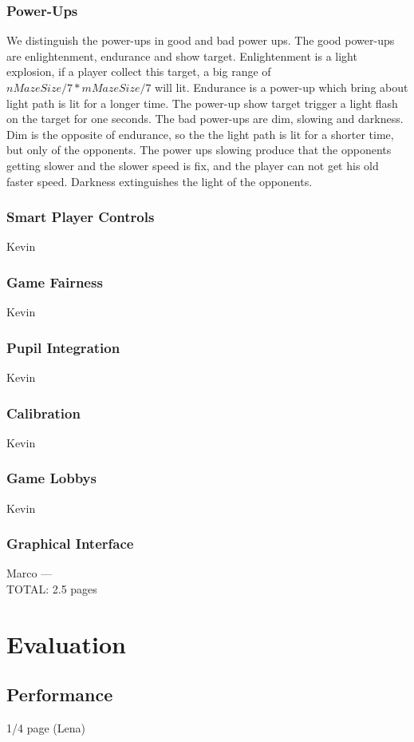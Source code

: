\documentclass{sigchi}
\begin{document}
\subsubsection{Power-Ups} We distinguish the power-ups in good and bad power ups. The good power-ups are enlightenment, endurance and show target. Enlightenment is a light explosion, if a player collect this target, a big range of $nMazeSize/7 * mMazeSize/7$ will lit. Endurance is a power-up which bring about light path is lit for a longer time. The power-up show target trigger a light flash on the target for one seconds. The bad power-ups are dim, slowing and darkness. Dim is the opposite of endurance, so the the light path is lit for a shorter time, but only of the opponents. The power ups slowing produce that the opponents getting slower and the slower speed is fix, and the player can not get his old faster speed. Darkness extinguishes the light of the opponents. 
\subsubsection{Smart Player Controls} Kevin
\subsubsection{Game Fairness} Kevin
\subsubsection{Pupil Integration} Kevin
\subsubsection{Calibration} Kevin
\subsubsection{Game Lobbys} Kevin
\subsubsection{Graphical Interface} 

Marco
---\\
TOTAL: 2.5 pages


\section{Evaluation}
\subsection{Performance}
1/4 page (Lena)
\end{document}
